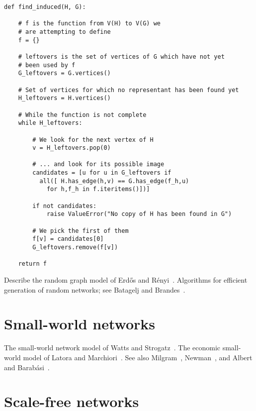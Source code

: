\begin{lstlisting}
def find_induced(H, G):

    # f is the function from V(H) to V(G) we
    # are attempting to define
    f = {}

    # leftovers is the set of vertices of G which have not yet
    # been used by f
    G_leftovers = G.vertices()

    # Set of vertices for which no representant has been found yet
    H_leftovers = H.vertices()

    # While the function is not complete
    while H_leftovers:

        # We look for the next vertex of H
        v = H_leftovers.pop(0)

        # ... and look for its possible image
        candidates = [u for u in G_leftovers if
          all([ H.has_edge(h,v) == G.has_edge(f_h,u)
            for h,f_h in f.iteritems()])]

        if not candidates:
            raise ValueError("No copy of H has been found in G")

        # We pick the first of them
        f[v] = candidates[0]
        G_leftovers.remove(f[v])

    return f
\end{lstlisting}

Describe the random graph model of Erd\H{o}s and
R{\'e}nyi~\cite{ErdosRenyi1959}. Algorithms for efficient generation
of random networks; see Batagelj and
Brandes~\cite{BatageljBrandes2005}.



\section{Small-world networks}

The small-world network model of Watts and
Strogatz~\cite{WattsStrogatz1998}. The economic small-world model of
Latora and Marchiori~\cite{LatoraMarchiori2003}. See also
Milgram~\cite{Milgram1967}, Newman~\cite{Newman2003}, and Albert and
Barab{\'a}si~\cite{AlbertBarabasi2002}.



\section{Scale-free networks}

